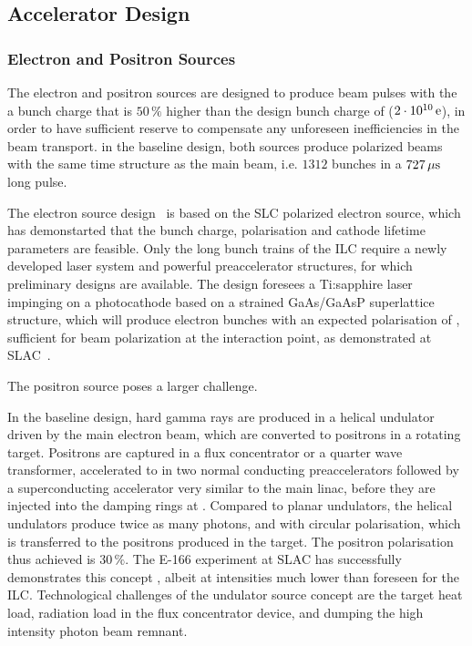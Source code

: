 
\subsection{Accelerator Design}

\subsubsection{Electron and Positron Sources}

The electron and positron sources are designed to produce  beam pulses with the a bunch charge that is $50\,\%$ higher than the design bunch charge of  ($2\cdot 10^{10}\,{\mathrm{e}}$), in order to have sufficient reserve to compensate  any unforeseen inefficiencies in the beam transport.
in the baseline design, both sources produce polarized beams with the same time structure as the main beam, i.e. $1312$ bunches in a $727\,{\mathrm{\mu s}}$ long pulse.

The electron source design~\cite{Adolphsen:2013kya} is based on the SLC polarized electron source, which has demonstarted that the bunch charge, polarisation and cathode lifetime parameters are feasible.
Only the long bunch trains of the ILC require a newly developed laser system and powerful preaccelerator structures, for which preliminary designs are available.
The design foresees a Ti:sapphire laser impinging on a photocathode based on a strained GaAs/GaAsP superlattice
structure, which will produce electron bunches with an expected polarisation of ,
sufficient for  beam polarization at the interaction point, as demonstrated at SLAC~\cite{Alley:1995ia}.

The positron source poses a larger challenge. 

In the baseline design, hard gamma rays are produced in a helical undulator driven by the main electron beam, which are converted to positrons in a rotating target.
Positrons are captured in a flux concentrator or a quarter wave transformer, accelerated to  in two normal conducting preaccelerators followed by a superconducting accelerator very similar to the main linac, before they are injected into the damping rings at .
Compared to planar undulators, the helical undulators produce twice as many photons, and with circular polarisation, which is transferred to the positrons produced in the target.
The positron polarisation thus achieved is $30\,\%$.
The E-166 experiment at SLAC has successfully demonstrates this concept  \cite{Alexander:2009nb}, albeit at intensities much lower than foreseen for the ILC. 
Technological challenges of the undulator source concept are the target heat load, radiation load in the flux concentrator device, and dumping the high intensity photon beam remnant.

